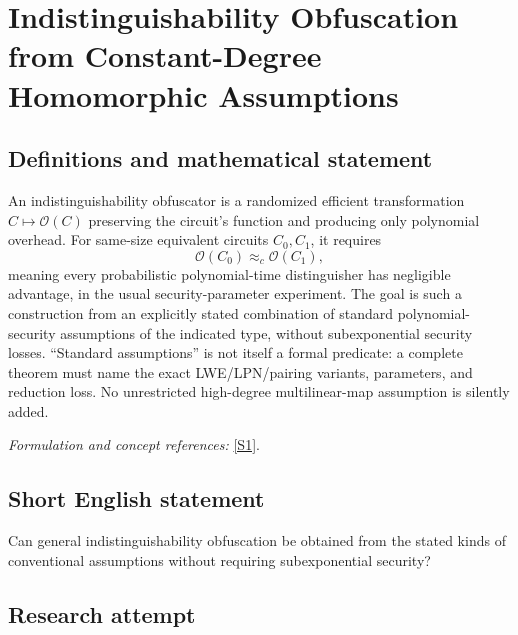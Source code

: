 \documentclass[11pt,a4paper]{article}
\newcommand{\sref}[2]{\hyperlink{source:#1:#2}{[S#2]}}
\newif\ifshowcatalogue
\newcommand{\cataloguescope}[1]{\ifshowcatalogue
 \paragraph{Exact scope in the supplied catalogue.}
 \begin{quote}\small #1\end{quote}\fi}
\numberwithin{equation}{section}
\begin{document}
\setcounter{section}{0}
\clearpage
\section*{\texorpdfstring{Indistinguishability Obfuscation from Constant-Degree Homomorphic Assumptions}{Indistinguishability Obfuscation from Constant-Degree Homomorphic Assumptions}}\label{statement}
\subsection{Definitions and mathematical statement}
An indistinguishability obfuscator is a randomized efficient transformation $C\mapsto\mathcal O(C)$ preserving the circuit's function and producing only polynomial overhead. For same-size equivalent circuits $C_0,C_1$, it requires
\[
 \mathcal O(C_0)\approx_c\mathcal O(C_1),
\]
meaning every probabilistic polynomial-time distinguisher has negligible advantage, in the usual security-parameter experiment. The goal is such a construction from an explicitly stated combination of standard polynomial-security assumptions of the indicated type, without subexponential security losses. ``Standard assumptions'' is not itself a formal predicate: a complete theorem must name the exact LWE/LPN/pairing variants, parameters, and reduction loss. No unrestricted high-degree multilinear-map assumption is silently added.
\par\smallskip\textit{Formulation and concept references:} \sref{statement}{1}.
\cataloguescope{Construct indistinguishability obfuscation based purely on standard polynomial-time assumptions (such as standard LWE, LPN, and degree-2 multilinear pairings) without sub-exponential loss.}
\subsection{Short English statement}
Can general indistinguishability obfuscation be obtained from the stated kinds of conventional assumptions without requiring subexponential security?
\subsection{Research attempt}
\end{document}
